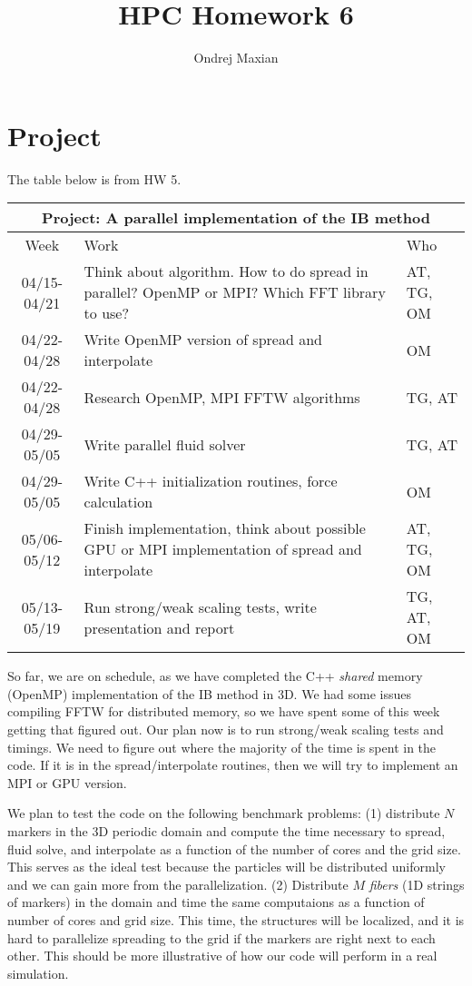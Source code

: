 \documentclass[a4paper]{article}
\title{HPC Homework 6}
\author{Ondrej Maxian}
\begin{document}
\maketitle

\section*{Project}
The table below is from HW 5. 

  \begin{center}
  \begin{tabular} {|c|p{9cm}|p{2cm}|}
    \hline
    \multicolumn{3}{|c|}{\bf Project: A parallel implementation of the IB method} \\
    \hline
    Week & Work & Who  \\ \hline \hline
    04/15-04/21 & Think about
    algorithm. How to do spread in parallel? OpenMP or MPI? Which FFT library to use? &  AT, TG, OM \\ \hline
    04/22-04/28 & Write OpenMP version of spread and interpolate & OM \\ \hline
    04/22-04/28 & Research OpenMP, MPI FFTW algorithms & TG, AT \\ \hline
    04/29-05/05 & Write parallel fluid solver & TG, AT \\ \hline
    04/29-05/05 & Write C++ initialization routines, force calculation & OM \\ \hline
    05/06-05/12 & Finish implementation, think about possible GPU or MPI implementation of spread and interpolate & AT, TG, OM \\ \hline
    05/13-05/19 & Run strong/weak scaling tests, write presentation and report  & TG, AT, OM \\ \hline
  \end{tabular}
  \end{center}

So far, we are on schedule, as we have completed the C++ \textit{shared} memory (OpenMP) implementation of the IB method in 3D. We had some issues compiling FFTW for distributed memory, so we have spent some of this week getting that figured out. Our plan now is to run strong/weak scaling tests and timings. We need to figure out where the majority of the time is spent in the code. If it is in the spread/interpolate routines, then we will try to implement an MPI or GPU version. 

We plan to test the code on the following benchmark problems: (1) distribute $N$ markers in the 3D periodic domain and compute the time necessary to spread, fluid solve, and interpolate as a function of the number of cores and the grid size. This serves as the ideal test because the particles will be distributed uniformly and we can gain more from the parallelization. (2) Distribute $M$ \textit{fibers} (1D strings of markers) in the domain and time the same computaions as a function of number of cores and grid size. This time, the structures will be localized, and it is hard  to parallelize spreading to the grid if the markers are right next to each other. This should be more illustrative of how our code will perform in a real simulation. 
\end{document}
